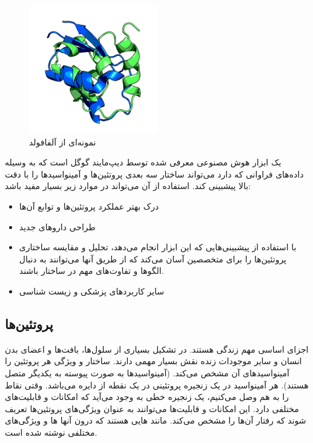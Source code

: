 \documentclass[10pt, a4paper]{article}
\begin{document}
\begin{figure}[H]
    \centering
    \includegraphics[width=0.5\textwidth]{images/sample_alphafold.png}
    \caption{نمونه‌ای از آلفافولد}
    \label{fig: alphafold}
\end{figure}

یک ابزار هوش مصنوعی معرفی شده توسط دیپ‌مایند گوگل است که به وسیله داده‌های
فراوانی که دارد می‌تواند ساختار سه بعدی پروتئین‌ها و آمینواسید‌ها را با دقت بالا
پیشبینی کند. استفاده از آن می‌تواند در موارد زیر بسیار مفید باشد:

\begin{itemize}
    \item درک بهتر عملکرد پروتئین‌ها و توابع آن‌ها
    \item طراحی دارو‌های جدید
    \item با استفاده از پیشبینی‌هایی که این ابزار انجام می‌دهد، تحلیل و مقایسه
    ساختاری پروتئین‌ها را برای متخصصین آسان می‌کند که از طریق آنها می‌توانند به
    دنبال الگو‌ها و تفاوت‌های مهم در ساختار باشند.
    \item سایر کاربرد‌های پزشکی و زیست شناسی 
\end{itemize}

\subsection{پروتئین‌ها}

اجزای اساسی مهم زندگی هستند. در تشکیل بسیاری از سلول‌ها، بافت‌ها و اعضای بدن
انسان و سایر موجودات زنده نقش بسیار مهمی دارند. ساختار و ویژگی هر پروتئین را
آمینواسید‌های آن مشخص می‌کند. (آمینواسید‌ها به صورت پیوسته به یکدیگر متصل
هستند). هر آمینواسید در یک زنجیره پروتئینی در یک نقطه از دایره می‌باشد. وقتی
نقاط را به هم وصل می‌کنیم، یک زنجیره خطی به وجود می‌آید که امکانات و قابلیت‌های
مختلفی دارد. این امکانات و قابلیت‌ها می‌توانند به عنوان ویژگی‌های پروتئین‌ها
تعریف شوند که رفتار آن‌ها را مشخص می‌کند. مانند هایی هستند که درون
آنها ها و ویژگی‌های مختلفی نوشته شده است.
\end{document}
